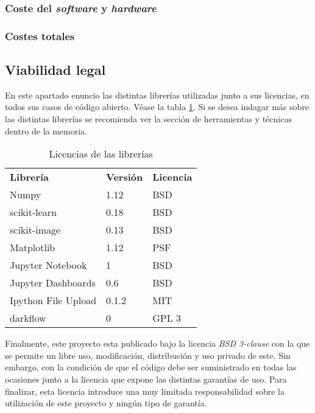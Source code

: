 \subsubsection{Coste del \textit{software} y \textit{hardware}}



\subsubsection{Costes totales}



\subsection{Viabilidad legal}

En este apartado enuncio las distintas librerías utilizadas junto a sus licencias, en todos sus casos de código abierto. Véase la tabla \ref{tabla:licencias}. Si se desea indagar más sobre las distintas librerías se recomienda ver la sección de herramientas y técnicas dentro de la memoria.
 
  \begin{table}
  \begin{center}
   \begin{tabular}{p{3.5cm} p{1.5cm} p{2.5cm}}
    \toprule
    \textbf{Librería} & \textbf{Versión} & \textbf{Licencia} \\
    \otoprule
    Numpy & 1.12 & BSD \\
    scikit-learn & 0.18 & BSD \\
    scikit-image & 0.13 & BSD \\
    Matplotlib & 1.12 & PSF \\
    Jupyter Notebook & 1 & BSD \\
    Jupyter Dashboards & 0.6 & BSD \\
	Ipython File Upload & 0.1.2 & MIT \\
	darkflow & 0 & GPL 3 \\
    \bottomrule
   \end{tabular}
   \caption{Licencias de las librerías}
   \label{tabla:licencias}
  \end{center}
 \end{table}
 
 Finalmente, este proyecto esta publicado bajo la licencia \textit{BSD 3-clause} con la que se permite un libre uso, modificación, distribución y uso privado de este. Sin embargo, con la condición de que el código debe ser suministrado en todas las ocasiones junto a la licencia que expone las distintas garantías de uso. Para finalizar, esta licencia introduce una muy limitada responsabilidad sobre la utilización de este proyecto y ningún tipo de garantía.
